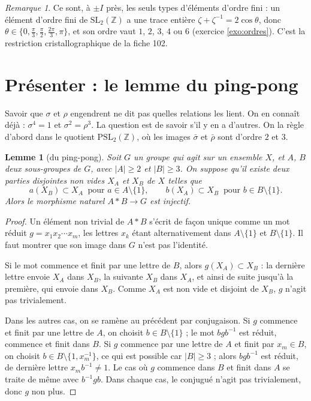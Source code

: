 \documentclass[11pt,a4paper]{article}
\theoremstyle{plain}
\newtheorem{lemme}[theoreme]{Lemme}
\theoremstyle{definition}
\theoremstyle{remark}
\newtheorem{remarque}[theoreme]{Remarque}
\newcommand{\Z}{\mathbb{Z}}
\newcommand{\SL}{\mathrm{SL}}
\newcommand{\PSL}{\mathrm{PSL}}
\begin{document}
\begin{remarque}
Ce sont, à $\pm I$ près, les seuls types d'éléments d'ordre fini : un élément d'ordre fini de $\SL_2(\Z)$ a une trace entière $\zeta+\zeta^{-1}=2\cos\theta$, donc $\theta\in\{0,\frac\pi3,\frac\pi2,\frac{2\pi}3,\pi\}$, et son ordre vaut $1$, $2$, $3$, $4$ ou $6$ (exercice \ref{exo:ordres}). C'est la restriction cristallographique de la fiche 102.
\end{remarque}

\section{Présenter : le lemme du ping-pong}

Savoir que $\sigma$ et $\rho$ engendrent ne dit pas quelles relations les lient. On en connaît déjà : $\sigma^4=1$ et $\sigma^2=\rho^3$. La question est de savoir s'il y en a d'autres. On la règle d'abord dans le quotient $\PSL_2(\Z)$, où les images $\bar\sigma$ et $\bar\rho$ sont d'ordre $2$ et $3$.

\begin{lemme}[du ping-pong]\label{lem:pingpong}
Soit $G$ un groupe qui agit sur un ensemble $X$, et $A$, $B$ deux sous-groupes de $G$, avec $|A|\geq2$ et $|B|\geq3$. On suppose qu'il existe deux parties disjointes non vides $X_A$ et $X_B$ de $X$ telles que
\[
  a(X_B)\subset X_A\ \text{ pour } a\in A\setminus\{1\},\qquad b(X_A)\subset X_B\ \text{ pour } b\in B\setminus\{1\}.
\]
Alors le morphisme naturel $A*B\to G$ est injectif.
\end{lemme}

\begin{proof}
Un élément non trivial de $A*B$ s'écrit de façon unique comme un mot réduit $g=x_1x_2\cdots x_m$, les lettres $x_k$ étant alternativement dans $A\setminus\{1\}$ et $B\setminus\{1\}$. Il faut montrer que son image dans $G$ n'est pas l'identité.

Si le mot commence et finit par une lettre de $B$, alors $g(X_A)\subset X_B$ : la dernière lettre envoie $X_A$ dans $X_B$, la suivante $X_B$ dans $X_A$, et ainsi de suite jusqu'à la première, qui envoie dans $X_B$. Comme $X_A$ est non vide et disjoint de $X_B$, $g$ n'agit pas trivialement.

Dans les autres cas, on se ramène au précédent par conjugaison. Si $g$ commence et finit par une lettre de $A$, on choisit $b\in B\setminus\{1\}$ ; le mot $bgb^{-1}$ est réduit, commence et finit dans $B$. Si $g$ commence par une lettre de $A$ et finit par $x_m\in B$, on choisit $b\in B\setminus\{1,x_m^{-1}\}$, ce qui est possible car $|B|\geq3$ ; alors $bgb^{-1}$ est réduit, de dernière lettre $x_mb^{-1}\neq1$. Le cas où $g$ commence dans $B$ et finit dans $A$ se traite de même avec $b^{-1}gb$. Dans chaque cas, le conjugué n'agit pas trivialement, donc $g$ non plus.
\end{proof}
\end{document}
